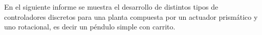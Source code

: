 %
%
%

En el siguiente informe se muestra el desarrollo de distintos tipos de controladores discretos para una planta compuesta por un actuador prismático y uno rotacional, es decir un péndulo simple con carrito.

%